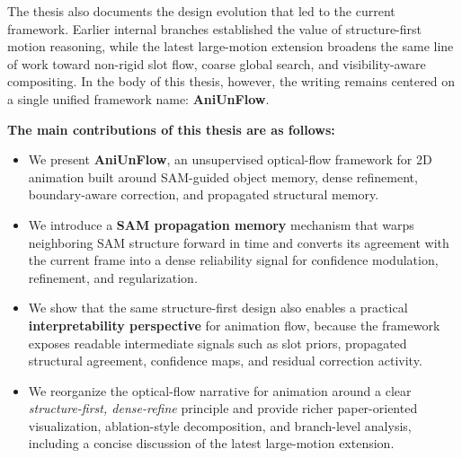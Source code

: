 The thesis also documents the design evolution that led to the current framework. Earlier internal branches established the value of structure-first motion reasoning, while the latest large-motion extension broadens the same line of work toward non-rigid slot flow, coarse global search, and visibility-aware compositing. In the body of this thesis, however, the writing remains centered on a single unified framework name: \textbf{AniUnFlow}.

\textbf{The main contributions of this thesis are as follows:}
\begin{itemize}
\item We present \textbf{AniUnFlow}, an unsupervised optical-flow framework for 2D animation built around SAM-guided object memory, dense refinement, boundary-aware correction, and propagated structural memory.
\item We introduce a \textbf{SAM propagation memory} mechanism that warps neighboring SAM structure forward in time and converts its agreement with the current frame into a dense reliability signal for confidence modulation, refinement, and regularization.
\item We show that the same structure-first design also enables a practical \textbf{interpretability perspective} for animation flow, because the framework exposes readable intermediate signals such as slot priors, propagated structural agreement, confidence maps, and residual correction activity.
\item We reorganize the optical-flow narrative for animation around a clear \emph{structure-first, dense-refine} principle and provide richer paper-oriented visualization, ablation-style decomposition, and branch-level analysis, including a concise discussion of the latest large-motion extension.
\end{itemize}
